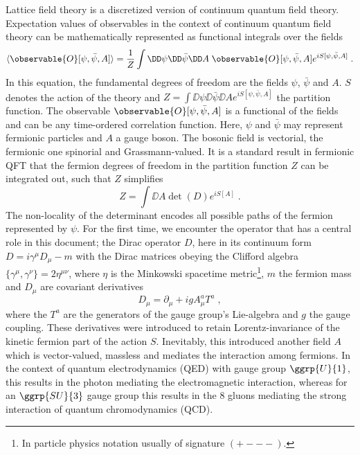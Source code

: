 Lattice field theory is a discretized version of continuum quantum field theory.
Expectation values of observables in the context of continuum quantum field theory can be mathematically represented as functional integrals over the fields~\cite{Feynman1948}
\begin{equation} \label{eq:path:integral:expectation:value}
\langle \observable{O}[\psi, \bar{\psi}, A] \rangle =
\frac{1}{Z} \int
\DD \psi
\DD \bar{\psi}
\DD A \;
\observable{O}[\psi, \bar{\psi}, A]
e^{i S[\psi, \bar{\psi}, A]} \;.
\end{equation}
In this equation, the fundamental degrees of freedom are the fields $\psi$, $\bar{\psi}$ and $A$.
$S$ denotes the action of the theory and $Z = \int \DD \psi \DD \bar{\psi} \DD A e^{i S[\psi, \bar{\psi}, A]}$ the partition function.
The observable $\observable{O}[\psi, \bar{\psi}, A]$ is a functional of the fields and can be any time-ordered correlation function.
Here, $\psi$ and $\bar{\psi}$ may represent fermionic particles and $A$ a gauge boson.
The bosonic field is vectorial, the fermionic one spinorial and Grassmann-valued.
It is a standard result in fermionic QFT that the fermion degrees of freedom in the partition function $Z$ can be integrated out, such that $Z$ simplifies
\begin{equation}
Z = \int \DD A \det(D) e^{i S[A]} \;.
\end{equation}
The non-locality of the determinant encodes all possible paths of the fermion represented by $\psi$.
For the first time, we encounter the operator that has a central role in this document; the Dirac operator $D$, here in its continuum form $D = i \gamma^{\mu} D_{\mu} - m$ with the Dirac matrices obeying the Clifford algebra $\{\gamma^{\mu}, \gamma^{\nu}\} = 2 \eta^{\mu \nu}$, where $\eta$ is the Minkowski spacetime metric\footnote{In particle physics notation usually of signature $(+---)$.}, $m$ the fermion mass and $D_{\mu}$ are covariant derivatives
\begin{equation}
D_{\mu} = \partial_{\mu} + ig A_{\mu}^{a} T^{a} \;,
\end{equation}
where the $T^{a}$ are the generators of the gauge group's Lie-algebra and $g$ the gauge coupling.
These derivatives were introduced to retain Lorentz-invariance of the kinetic fermion part of the action $S$.
Inevitably, this introduced another field $A$ which is vector-valued, massless and mediates the interaction among fermions.
In the context of quantum electrodynamics (QED) with gauge group $\ggrp{U}{1}$, this results in the photon mediating the electromagnetic interaction, whereas for an $\ggrp{SU}{3}$ gauge group this results in the \num{8} gluons mediating the strong interaction of quantum chromodynamics (QCD).

